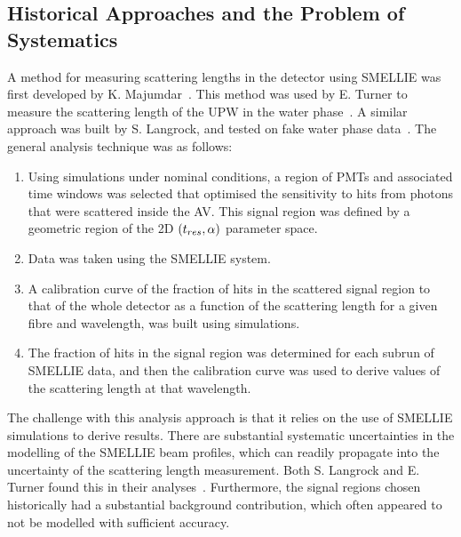 \subsection{Historical Approaches and the Problem of Systematics}
A method for measuring scattering lengths in the detector using SMELLIE was first developed by K. Majumdar~\cite{majumdarMeasurementOpticalScattering2015}. This method was used by E. Turner to measure the scattering length of the UPW in the water phase~\cite{turnerMeasurementScatteringCharacteristics2022}. A similar approach was built by S. Langrock, and tested on fake water phase data~\cite{langrockMeasurementRayleighScattering2016}. The general analysis technique was as follows:
\begin{enumerate}
    \item Using simulations under nominal conditions, a region of PMTs and associated time windows was selected that optimised the sensitivity to hits from photons that were scattered inside the AV. This signal region was defined by a geometric region of the 2D $(t_{res}{},\alpha)$ parameter space.
    \item Data was taken using the SMELLIE system.
    \item A calibration curve of the fraction of hits in the scattered signal region to that of the whole detector as a function of the scattering length for a given fibre and wavelength, was built using simulations.
    \item The fraction of hits in the signal region was determined for each subrun of SMELLIE data, and then the calibration curve was used to derive values of the scattering length at that wavelength.
\end{enumerate}

The challenge with this analysis approach is that it relies on the use of SMELLIE simulations to derive results. There are substantial systematic uncertainties in the modelling of the SMELLIE beam profiles, which can readily propagate into the uncertainty of the scattering length measurement. Both S. Langrock and E. Turner found this in their analyses~\cite{langrockMeasurementRayleighScattering2016,turnerMeasurementScatteringCharacteristics2022}. Furthermore, the signal regions chosen historically had a substantial background contribution, which often appeared to not be modelled with sufficient accuracy.

